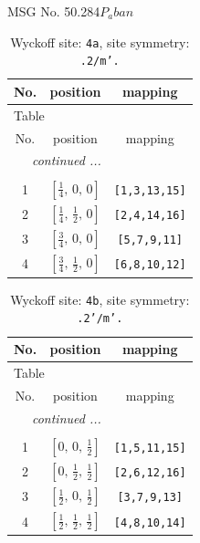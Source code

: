 \documentclass[fleqn,8pt]{jsarticle}
\begin{document}
\setcounter{MaxMatrixCols}{32}

\renewcommand{\tablename}{Table~}
\renewcommand{\figurename}{Figure~}
\begin{center}
\LARGE
MSG No. 50.284\quad$P_{a}ban$
\end{center}
\renewcommand{\arraystretch}{1.2}
\begin{longtable}{ccc}
\caption{Wyckoff site: {\tt 4a}, site symmetry: {\tt .2/m'.}}
 \\
 \hline \hline
No. & position & mapping \\ \hline \endfirsthead

\multicolumn{2}{l}{\tablename\ \thetable{}} \\
 \hline \hline
No. & position & mapping \\ \hline \endhead

 \hline \hline
\multicolumn{2}{r}{\footnotesize\it continued ...} \\ \endfoot

 \hline \hline
\multicolumn{2}{r}{} \\ \endlastfoot

1 & $\left[ \frac{1}{4},\, 0,\, 0 \right]$ & {\tt [1,3,13,15]} \\ \hline
2 & $\left[ \frac{1}{4},\, \frac{1}{2},\, 0 \right]$ & {\tt [2,4,14,16]} \\ \hline
3 & $\left[ \frac{3}{4},\, 0,\, 0 \right]$ & {\tt [5,7,9,11]} \\ \hline
4 & $\left[ \frac{3}{4},\, \frac{1}{2},\, 0 \right]$ & {\tt [6,8,10,12]} \\
\end{longtable}
\renewcommand{\arraystretch}{1.2}
\begin{longtable}{ccc}
\caption{Wyckoff site: {\tt 4b}, site symmetry: {\tt .2'/m'.}}
 \\
 \hline \hline
No. & position & mapping \\ \hline \endfirsthead

\multicolumn{2}{l}{\tablename\ \thetable{}} \\
 \hline \hline
No. & position & mapping \\ \hline \endhead

 \hline \hline
\multicolumn{2}{r}{\footnotesize\it continued ...} \\ \endfoot

 \hline \hline
\multicolumn{2}{r}{} \\ \endlastfoot

1 & $\left[ 0,\, 0,\, \frac{1}{2} \right]$ & {\tt [1,5,11,15]} \\ \hline
2 & $\left[ 0,\, \frac{1}{2},\, \frac{1}{2} \right]$ & {\tt [2,6,12,16]} \\ \hline
3 & $\left[ \frac{1}{2},\, 0,\, \frac{1}{2} \right]$ & {\tt [3,7,9,13]} \\ \hline
4 & $\left[ \frac{1}{2},\, \frac{1}{2},\, \frac{1}{2} \right]$ & {\tt [4,8,10,14]} \\
\end{longtable}
\end{document}
